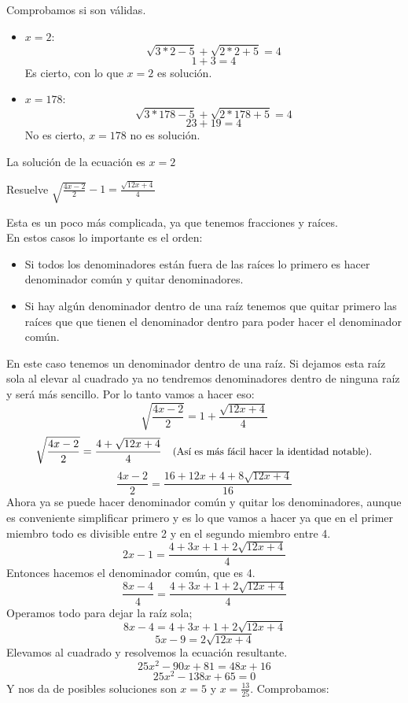 \documentclass[a4paper,11pt,answers]{exam}
\begin{document}
\begin{questions}
\begin{solution}
    Comprobamos si son válidas.
    \begin{itemize}
    \item $x = 2$:
      \[\sqrt{3*2 - 5} + \sqrt{2*2 + 5} = 4\]
      \[1 + 3 = 4\]
      Es cierto, con lo que $x = 2$ es solución.
    \item $x = 178$:
      \[\sqrt{3*178 - 5} + \sqrt{2*178+5} = 4\]
      \[23 + 19 = 4\]
      No es cierto, $x = 178$ no es solución.
    \end{itemize}
    La solución de la ecuación es $x = 2$
  \end{solution}
\question Resuelve $\sqrt{\frac{4x-2}{2}} - 1 = \frac{\sqrt{12x + 4}}{4}$
  \begin{solution}
    Esta es un poco más complicada, ya que tenemos fracciones y raíces.\\
    En estos casos lo importante es el orden:
    \begin{itemize}
    \item Si todos los denominadores están fuera de las raíces lo primero es hacer denominador común y quitar denominadores.
    \item Si hay algún denominador dentro de una raíz tenemos que quitar primero las raíces que que tienen el denominador dentro para
      poder hacer el denominador común.
    \end{itemize}
    En este caso tenemos un denominador dentro de una raíz. Si dejamos esta raíz sola al elevar al cuadrado ya no tendremos denominadores
    dentro de ninguna raíz y será más sencillo. Por lo tanto vamos a hacer eso:
    \[\sqrt{\frac{4x - 2}{2}} = 1 + \frac{\sqrt{12x+4}}{4}\]
    \[\sqrt{\frac{4x - 2}{2}} = \frac{4+\sqrt{12x+4}}{4}
      \quad\text{\small{(Así es más fácil hacer la identidad notable).}}\]
    \[\frac{4x - 2}{2} = \frac{16 + 12x + 4 + 8\sqrt{12x+4}}{16}\]
    Ahora ya se puede hacer denominador común y quitar los denominadores, aunque es conveniente simplificar primero y es lo que vamos
    a hacer ya que en el primer miembro todo es divisible entre 2 y en el segundo miembro entre 4.
    \[2x - 1 = \frac{4 + 3x + 1 + 2\sqrt{12x + 4}}{4}\]
    Entonces hacemos el denominador común, que es 4.
    \[\frac{8x - 4}{4} = \frac{4 + 3x + 1 + 2\sqrt{12x + 4}}{4}\]
    Operamos todo para dejar la raíz sola;
    \[8x - 4 = 4 + 3x + 1 + 2\sqrt{12x + 4}\]
    \[5x -9 = 2\sqrt{12x + 4}\]
    Elevamos al cuadrado y resolvemos la ecuación resultante.
    \[25x^2 - 90 x + 81 = 48x + 16\]
    \[25x^2 - 138x + 65 = 0\]
    Y nos da de posibles soluciones son $x = 5$ y $x = \frac{13}{25}$. Comprobamos:

\end{solution}
\end{questions}
\end{document}
